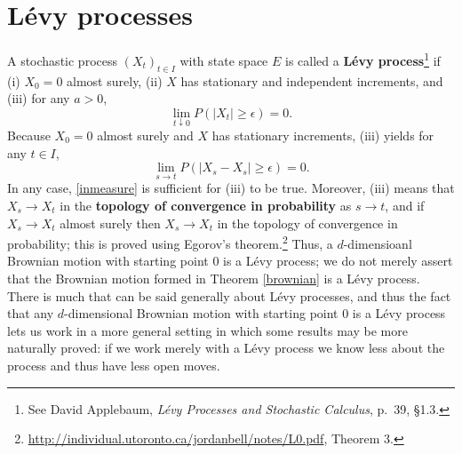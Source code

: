 \documentclass{article}
\theoremstyle{definition}
\begin{document}
\section{L\'evy processes}
A stochastic process $(X_t)_{t \in I}$ with state space $E$ is called a \textbf{L\'evy process}\footnote{See
David Applebaum, {\em L\'evy Processes and Stochastic Calculus}, p.~39, \S 1.3.}
 if
(i) $X_0=0$ almost surely, (ii) $X$ has stationary and independent increments, and (iii)
for any $a>0$,
\[
\lim_{t \downarrow 0} P(|X_{t}| \geq \epsilon) = 0.
\]
Because $X_0=0$ almost surely and $X$ has stationary increments, (iii) yields for
any $t \in I$,
\begin{equation}
\lim_{s \to t} P(|X_s-X_s| \geq \epsilon)=0.
\label{inmeasure}
\end{equation}
In any case, \eqref{inmeasure} is sufficient for (iii) to be true.
Moreover, (iii) means
that $X_s \to X_t$ in the \textbf{topology of convergence in probability} as $s \to t$, and 
if $X_s \to X_t$ almost surely then  $X_s \to X_t$ in the topology of convergence in probability; this is proved
using Egorov's theorem.\footnote{\url{http://individual.utoronto.ca/jordanbell/notes/L0.pdf}, Theorem 3.}
Thus, a $d$-dimensioanl Brownian motion with starting point $0$ is a L\'evy process; we do not merely assert that the Brownian motion
formed in Theorem \ref{brownian} is a L\'evy process.
There is much that can be said generally about L\'evy processes, and thus the fact that any $d$-dimensional Brownian motion with starting point $0$ is a L\'evy
process lets us work in a more general setting in which some results may be more naturally proved: if we work merely with a L\'evy process we know less about the process and thus have less open moves. 
\end{document}
